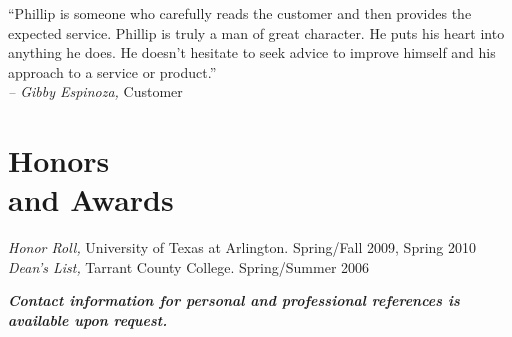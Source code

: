 \documentclass[margin]{res}
\newcommand{\sectionspace}{\vspace{8pt}}
\begin{document}
\begin{resume}
                ``Phillip is someone who carefully reads the customer and then
                provides the expected service. Phillip is truly a man of great character.
                He puts his heart into anything he does. He doesn't hesitate to seek advice
                to improve himself and his approach to a service or product.''                    \\
                \textit{-- Gibby Espinoza,} Customer

\sectionspace


\section{\textsf{Honors \\and Awards}}

                \textit{Honor Roll,} University of Texas at Arlington. Spring/Fall 2009, Spring 2010 \\
                \textit{Dean's List,} Tarrant County College. Spring/Summer 2006

\sectionspace


\textit{\textbf{\footnotesize Contact information for personal and professional references is available upon request.}}


\end{resume}
\end{document}
